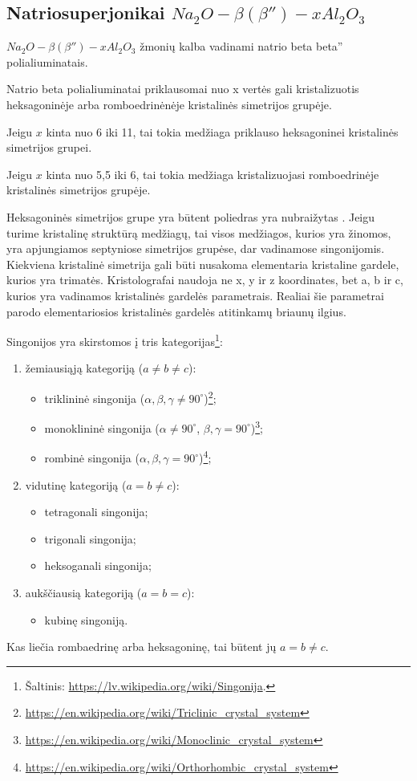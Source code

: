 \subsection{Natriosuperjonikai $Na_{2}O-\beta(\beta'')-xAl_{2}O_{3}$}

$Na_{2}O-\beta(\beta'')-xAl_{2}O_{3}$ žmonių kalba vadinami
natrio beta beta'' polialiuminatais.

Natrio beta polialiuminatai priklausomai nuo x vertės gali kristalizuotis
heksagoninėje arba romboedrinėnėje kristalinės simetrijos grupėje.

Jeigu $x$ kinta nuo 6 iki 11, tai tokia medžiaga priklauso heksagoninei
kristalinės simetrijos grupei.

Jeigu $x$ kinta nuo 5,5 iki 6, tai tokia medžiaga kristalizuojasi
romboedrinėje kristalinės simetrijos grupėje.

Heksagoninės simetrijos grupe yra būtent poliedras yra nubraižytas
. Jeigu turime kristalinę struktūrą medžiagų, tai visos
medžiagos, kurios yra žinomos, yra apjungiamos septyniose simetrijos
grupėse, dar vadinamose singonijomis. Kiekviena kristalinė simetrija
gali būti nusakoma elementaria kristaline gardele, kurios yra
trimatės. Kristolografai naudoja ne x, y ir z koordinates, bet a,
b ir c, kurios yra vadinamos kristalinės gardelės parametrais.
Realiai šie parametrai parodo elementariosios kristalinės gardelės
atitinkamų briaunų ilgius.

Singonijos yra skirstomos į tris kategorijas\footnote{Šaltinis:
\url{https://lv.wikipedia.org/wiki/Singonija}.}:
\begin{enumerate}
  \item žemiausiąją kategoriją ($a \neq b \neq c$):
    \begin{itemize}
      \item triklininė singonija
        ($\alpha,\beta,\gamma \neq 90^{\circ}$)\footnote{
        \url{https://en.wikipedia.org/wiki/Triclinic_crystal_system}};
      \item monoklininė singonija
        ($\alpha \neq 90^{\circ}$, $\beta,\gamma = 90^{\circ}$)\footnote{
        \url{https://en.wikipedia.org/wiki/Monoclinic_crystal_system}};
      \item rombinė singonija
        ($\alpha,\beta,\gamma = 90^{\circ}$)\footnote{
        \url{https://en.wikipedia.org/wiki/Orthorhombic_crystal_system}};
    \end{itemize}
  \item vidutinę kategoriją ($a = b \neq c$):
    \begin{itemize}
      \item tetragonali singonija;
      \item trigonali singonija;
      \item heksoganali singonija;
    \end{itemize}
  \item aukščiausią kategoriją ($a = b = c$):
    \begin{itemize}
      \item kubinę singoniją.
    \end{itemize}
\end{enumerate}
Kas liečia rombaedrinę arba heksagoninę, tai būtent jų $a = b \neq c$.

